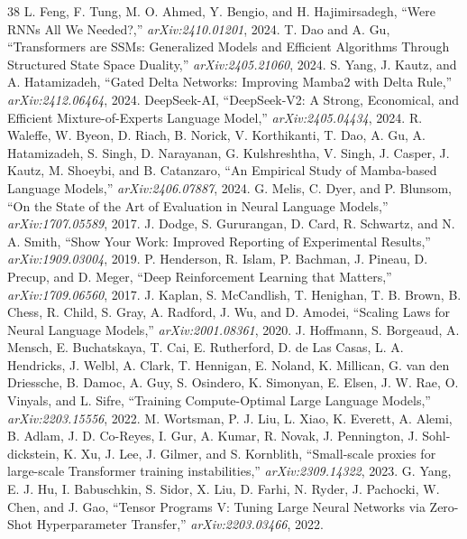 \begin{thebibliography}{38}
\setlength{\itemsep}{2pt}
 L. Feng, F. Tung, M. O. Ahmed, Y. Bengio, and H. Hajimirsadegh, ``Were RNNs All We Needed?,'' \emph{arXiv:2410.01201}, 2024.
 T. Dao and A. Gu, ``Transformers are SSMs: Generalized Models and Efficient Algorithms Through Structured State Space Duality,'' \emph{arXiv:2405.21060}, 2024.
 S. Yang, J. Kautz, and A. Hatamizadeh, ``Gated Delta Networks: Improving Mamba2 with Delta Rule,'' \emph{arXiv:2412.06464}, 2024.
 DeepSeek-AI, ``DeepSeek-V2: A Strong, Economical, and Efficient Mixture-of-Experts Language Model,'' \emph{arXiv:2405.04434}, 2024.
 R. Waleffe, W. Byeon, D. Riach, B. Norick, V. Korthikanti, T. Dao, A. Gu, A. Hatamizadeh, S. Singh, D. Narayanan, G. Kulshreshtha, V. Singh, J. Casper, J. Kautz, M. Shoeybi, and B. Catanzaro, ``An Empirical Study of Mamba-based Language Models,'' \emph{arXiv:2406.07887}, 2024.
 G. Melis, C. Dyer, and P. Blunsom, ``On the State of the Art of Evaluation in Neural Language Models,'' \emph{arXiv:1707.05589}, 2017.
 J. Dodge, S. Gururangan, D. Card, R. Schwartz, and N. A. Smith, ``Show Your Work: Improved Reporting of Experimental Results,'' \emph{arXiv:1909.03004}, 2019.
 P. Henderson, R. Islam, P. Bachman, J. Pineau, D. Precup, and D. Meger, ``Deep Reinforcement Learning that Matters,'' \emph{arXiv:1709.06560}, 2017.
 J. Kaplan, S. McCandlish, T. Henighan, T. B. Brown, B. Chess, R. Child, S. Gray, A. Radford, J. Wu, and D. Amodei, ``Scaling Laws for Neural Language Models,'' \emph{arXiv:2001.08361}, 2020.
 J. Hoffmann, S. Borgeaud, A. Mensch, E. Buchatskaya, T. Cai, E. Rutherford, D. de Las Casas, L. A. Hendricks, J. Welbl, A. Clark, T. Hennigan, E. Noland, K. Millican, G. van den Driessche, B. Damoc, A. Guy, S. Osindero, K. Simonyan, E. Elsen, J. W. Rae, O. Vinyals, and L. Sifre, ``Training Compute-Optimal Large Language Models,'' \emph{arXiv:2203.15556}, 2022.
 M. Wortsman, P. J. Liu, L. Xiao, K. Everett, A. Alemi, B. Adlam, J. D. Co-Reyes, I. Gur, A. Kumar, R. Novak, J. Pennington, J. Sohl-dickstein, K. Xu, J. Lee, J. Gilmer, and S. Kornblith, ``Small-scale proxies for large-scale Transformer training instabilities,'' \emph{arXiv:2309.14322}, 2023.
 G. Yang, E. J. Hu, I. Babuschkin, S. Sidor, X. Liu, D. Farhi, N. Ryder, J. Pachocki, W. Chen, and J. Gao, ``Tensor Programs V: Tuning Large Neural Networks via Zero-Shot Hyperparameter Transfer,'' \emph{arXiv:2203.03466}, 2022.

\end{thebibliography}
